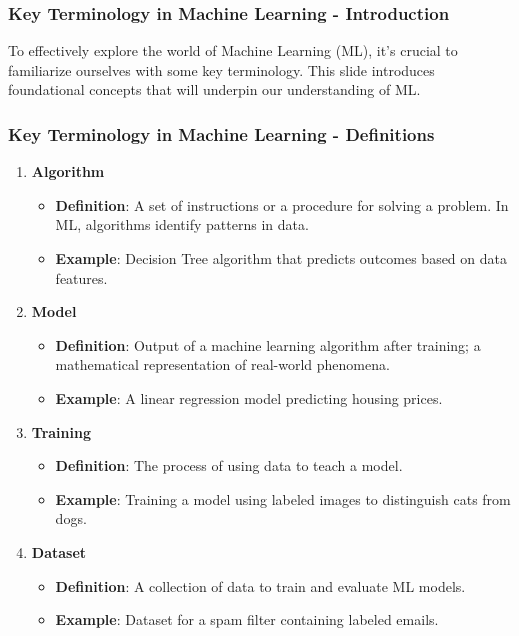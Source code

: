 \documentclass[aspectratio=169]{beamer}
\begin{document}
\begin{frame}[fragile]
    \frametitle{Key Terminology in Machine Learning - Introduction}
    To effectively explore the world of Machine Learning (ML), it's crucial to familiarize ourselves with some key terminology. This slide introduces foundational concepts that will underpin our understanding of ML.
\end{frame}

\begin{frame}[fragile]
    \frametitle{Key Terminology in Machine Learning - Definitions}
    \begin{enumerate}
        \item \textbf{Algorithm}
        \begin{itemize}
            \item \textbf{Definition}: A set of instructions or a procedure for solving a problem. In ML, algorithms identify patterns in data.
            \item \textbf{Example}: Decision Tree algorithm that predicts outcomes based on data features.
        \end{itemize}
        
        \item \textbf{Model}
        \begin{itemize}
            \item \textbf{Definition}: Output of a machine learning algorithm after training; a mathematical representation of real-world phenomena.
            \item \textbf{Example}: A linear regression model predicting housing prices.
        \end{itemize}
        
        \item \textbf{Training}
        \begin{itemize}
            \item \textbf{Definition}: The process of using data to teach a model.
            \item \textbf{Example}: Training a model using labeled images to distinguish cats from dogs.
        \end{itemize}
        
        \item \textbf{Dataset}
        \begin{itemize}
            \item \textbf{Definition}: A collection of data to train and evaluate ML models.
            \item \textbf{Example}: Dataset for a spam filter containing labeled emails.
        \end{itemize}
    \end{enumerate}
\end{frame}
\end{document}

